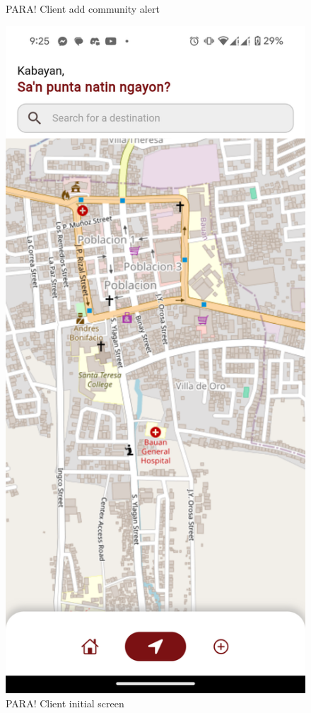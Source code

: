 \documentclass{icsthesis}
\begin{document}
\begin{mainmatter}
\begin{description}
\begin{figure}[!h]
			\caption{PARA! Client add community alert}
		\end{figure}

        \newpage
		
		\begin{figure}[!h]
			\centering
				\includegraphics[scale=0.1]{./figures/client/welcome.png}
			\caption{PARA! Client initial screen}
		\end{figure}
		

\end{description}
\end{mainmatter}
\end{document}
